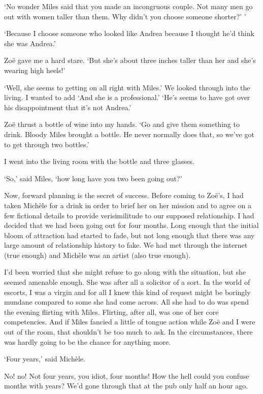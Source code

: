 `No wonder Miles said that you made an incongruous couple. Not many
men go out with women taller than them. Why didn't you choose
someone shorter?' '

`Because I choose someone who looked like Andrea because I thought
he'd think she was Andrea.'

Zoë gave me a hard stare. `But she's about three inches taller
than her and she's wearing high heels!'

`Well, she seems to getting on all right with Miles.' We looked
through into the living. I wanted to add `And she is a
professional.' `He's seems to have got over his disappointment that
it's not Andrea.'

Zoë thrust a bottle of wine into my hands. `Go and give them
something to drink. Bloody Miles brought a bottle. He never normally
does that, so we've got to get through two bottles.'

I went into the living room with the bottle and three glasses.

`So,' said Miles, `how long have you two been going out?'

Now, forward planning is the secret of success. Before coming to
Zoë's, I had taken Michèle for a drink in order to brief her
on her mission and to agree on a few fictional details to provide
verisimilitude to our supposed relationship. I had decided that we
had been going out for four months. Long enough that the initial
bloom of attraction had started to fade, but not long enough that
there was any large amount of relationship history to fake. We had
met through the internet (true enough) and Michèle was an artist
(also true enough).

I'd been worried that she might refuse to go along with the
situation, but she seemed amenable enough. She was after all a
solicitor of a sort. In the world of escorts, I was a virgin and
for all I knew this kind of request might be boringly mundane
compared to some she had come across. All she had to do was spend the
evening flirting with Miles. Flirting, after all, was one of her core
competencies. And if Miles fancied a little of tongue action while
Zoë and I were out of the room, that shouldn't be too much to
ask. In the circumstances, there was hardly going to be the chance
for anything more.

`Four years,' said Michèle.

No! no! Not four years, you idiot, four {\twelveit months!} How the
hell could you confuse months with years? We'd gone through that at
the pub only half an hour ago.

